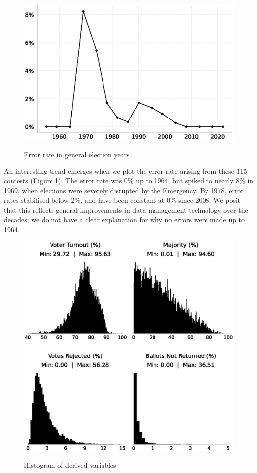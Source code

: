 \documentclass[11pt]{article}
\begin{document}
\begin{figure}[htbp]
	\centering
	\caption{Error rate in general election years}
	\vspace{0.14in}
	\includegraphics[width=0.7\linewidth]{dataviz/timeseries_error_rate.eps}
	\label{fig:error_rate}
\end{figure}


An interesting trend emerges when we plot the error rate arising from these 115 contests (Figure \ref{fig:error_rate}). The error rate was 0\% up to 1964, but spiked to nearly 8\% in 1969, when elections were severely disrupted by the Emergency. By 1978, error rates stabilised below 2\%, and have been constant at 0\% since 2008. We posit that this reflects general improvements in data management technology over the decades; we do not have a clear explanation for why no errors were made up to 1964.

\begin{figure}[ht]
	\centering
	\caption{Histogram of derived variables}
	\vspace{0.14in}
	\includegraphics[width=0.8\linewidth]{dataviz/histogram_validation.eps}
	\label{fig:histograms}
\end{figure}
\end{document}
